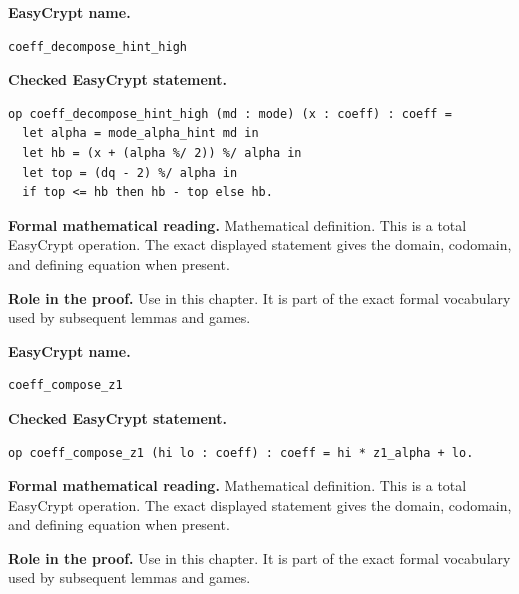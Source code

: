 \begin{formaldefinition}
\noindent\textbf{EasyCrypt name.}
\begin{lstlisting}[language=EasyCrypt,basicstyle=\ttfamily\scriptsize]
coeff_decompose_hint_high
\end{lstlisting}
\noindent\textbf{Checked EasyCrypt statement.}
\begin{lstlisting}[language=EasyCrypt,basicstyle=\ttfamily\scriptsize]
op coeff_decompose_hint_high (md : mode) (x : coeff) : coeff =
  let alpha = mode_alpha_hint md in
  let hb = (x + (alpha %/ 2)) %/ alpha in
  let top = (dq - 2) %/ alpha in
  if top <= hb then hb - top else hb.
\end{lstlisting}
\noindent\textbf{Formal mathematical reading.}
Mathematical definition. This is a total EasyCrypt operation.  The exact displayed statement gives the domain, codomain, and defining equation when present.

\noindent\textbf{Role in the proof.}
Use in this chapter. It is part of the exact formal vocabulary used by subsequent lemmas and games.

\end{formaldefinition}

\begin{formaldefinition}
\noindent\textbf{EasyCrypt name.}
\begin{lstlisting}[language=EasyCrypt,basicstyle=\ttfamily\scriptsize]
coeff_compose_z1
\end{lstlisting}
\noindent\textbf{Checked EasyCrypt statement.}
\begin{lstlisting}[language=EasyCrypt,basicstyle=\ttfamily\scriptsize]
op coeff_compose_z1 (hi lo : coeff) : coeff = hi * z1_alpha + lo.
\end{lstlisting}
\noindent\textbf{Formal mathematical reading.}
Mathematical definition. This is a total EasyCrypt operation.  The exact displayed statement gives the domain, codomain, and defining equation when present.

\noindent\textbf{Role in the proof.}
Use in this chapter. It is part of the exact formal vocabulary used by subsequent lemmas and games.

\end{formaldefinition}

